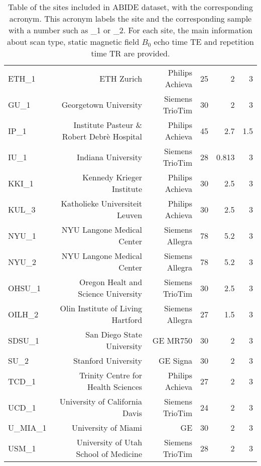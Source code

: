\documentclass[11pt]{report}
\begin{document}
\begin{table}[!htp]
\begin{tabular}{lrrrrr}
ETH\_1 & ETH Zurich &Philips Achieva &25 &2 &3 \\
GU\_1 &Georgetown University &Siemens TrioTim &30 &2 &3 \\
IP\_1 &Institute Pasteur \& Robert Debrè Hospital &Philips Achieva &45 &2.7 &1.5 \\
IU\_1 &Indiana University &Siemens TrioTim &28 &0.813 &3 \\
KKI\_1 &Kennedy Krieger Institute &Philips Achieva &30 &2.5 &3 \\
KUL\_3 &Katholieke Universiteit Leuven &Philips Achieva &30 &2.5 &3 \\
NYU\_1 &NYU Langone Medical Center &Siemens Allegra &78 &5.2 &3 \\
NYU\_2 &NYU Langone Medical Center &Siemens Allegra &78 &5.2 &3 \\
OHSU\_1 &Oregon Healt and Science University &Siemens TrioTim &30 &2.5 &3 \\
OILH\_2 &Olin Institute of Living Hartford &Siemens Allegra &27 &1.5 &3 \\
SDSU\_1 &San Diego State University &GE MR750 &30 &2 &3 \\
SU\_2 &Stanford University &GE Signa &30 &2 &3 \\
TCD\_1 &Trinity Centre for Health Sciences &Philips Achieva &27 &2 &3 \\
UCD\_1 &University of California Davis &Siemens TrioTim &24 &2 &3 \\
U\_MIA\_1 &University of Miami &GE &30 &2 &3 \\
USM\_1 &University of Utah School of Medicine &Siemens TrioTim &28 &2 &3 \\
\bottomrule
\end{tabular}
\caption{Table of the sites included in ABIDE dataset, with the corresponding acronym.
This acronym labels the site and the corresponding sample with a number such as \_1 or \_2.
For each site, the main information about scan type, static magnetic field $B_0$ echo time TE and repetition time TR are provided.}\label{tab:scan_sites}
\end{table}
\end{document}
